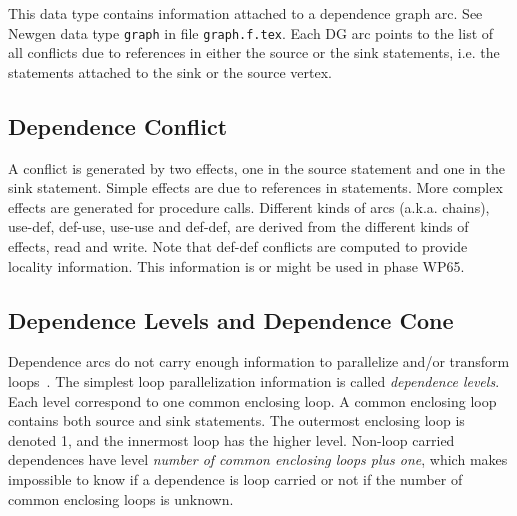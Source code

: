 \documentclass[a4paper]{article}
\begin{document}
{}

This data type contains information attached to a dependence graph arc.
See Newgen data type \verb/graph/ in file \verb/graph.f.tex/. Each DG arc
points to the list of all conflicts due to references in either the
source or the sink statements, i.e. the statements attached to the sink
or the source vertex.

\begin{comment}
Ce domaine est utilise' pour contenir les informations qui sont
attache'es a` chaque arc du graphe de de'pendances (voir le domaine {\tt
graph} dans le fichier {\tt graph.f.tex}). Chaque arc du GD contient les
conflits entre les deux statements des noeuds du graphe de de'pendance.
\end{comment}

\subsection{Dependence Conflict}

{}

A conflict is generated by two effects, one in the source statement and
one in the sink statement. Simple effects are due to references in
statements. More complex effects are generated for procedure
calls. Different kinds of arcs (a.k.a. chains), use-def, def-use,
use-use and def-def, are derived from the different kinds of effects,
read and write. Note that def-def conflicts are computed to provide
locality information. This information is or might be used in phase WP65.

\begin{comment}
Un conflit existe entre deux effets pre'sents dans deux noeuds voisins
du graphe de de'pendance. Les types d'effet (write, read) sert a`
distinguer les conflits ``use-def'', ``def-def'' et ``{def-use}''. Le
cone comprend les informations precises de conflict.
\end{comment}

\subsection{Dependence Levels and Dependence Cone}

{}

Dependence arcs do not carry enough information to parallelize and/or
transform loops~\cite{YAI95}. The simplest loop parallelization
information is called {\em dependence levels}. Each level correspond to
one common enclosing loop. A common enclosing loop contains both source
and sink statements. The outermost enclosing loop is denoted 1, and the
innermost loop has the higher level. Non-loop carried dependences have
level {\em number of common enclosing loops plus one}, which makes
impossible to know if a dependence is loop carried or not if the number of
common enclosing loops is unknown.
\end{document}
